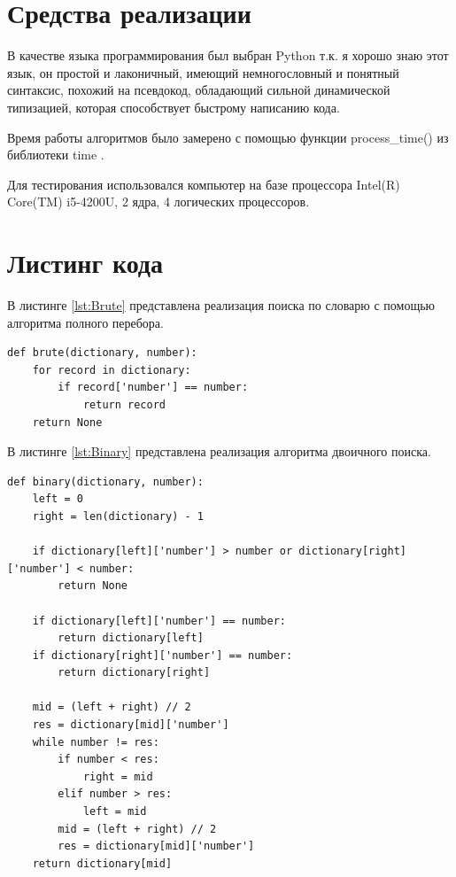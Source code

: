 \documentclass[12pt]{report}
\begin{document}
\section{Средства реализации}
В качестве языка программирования был выбран Python т.к. я хорошо знаю этот язык, он простой и лаконичный, имеющий немногословный и понятный синтаксис, похожий на псевдокод, обладающий сильной динамической типизацией, которая способствует быстрому написанию кода. 
 
Время  работы алгоритмов было замерено с помощью функции process\_time() из библиотеки time \cite{time}.

Для тестирования использовался компьютер на базе процессора Intel(R) Core(TM) i5-4200U, 2 ядра, 4 логических процессоров. 


\newpage
\section{Листинг кода}

В листинге \ref{lst:Brute} представлена реализация поиска по словарю с помощью алгоритма полного перебора.

\begin{lstlisting}[label={lst:Brute},caption=Реализация поиска по словарю с помощью алгоритма полного перебора.]
def brute(dictionary, number):
    for record in dictionary:
        if record['number'] == number:
            return record
    return None
\end{lstlisting} 

\vspace{\baselineskip}
В листинге \ref{lst:Binary} представлена реализация алгоритма двоичного поиска.
\begin{lstlisting}[label={lst:Binary},caption=Реализация алгоритма двоичного поиска.]
def binary(dictionary, number):
    left = 0
    right = len(dictionary) - 1

    if dictionary[left]['number'] > number or dictionary[right]['number'] < number:
        return None

    if dictionary[left]['number'] == number:
        return dictionary[left]
    if dictionary[right]['number'] == number:
        return dictionary[right]

    mid = (left + right) // 2
    res = dictionary[mid]['number']
    while number != res:
        if number < res:
            right = mid
        elif number > res:
            left = mid
        mid = (left + right) // 2
        res = dictionary[mid]['number']
    return dictionary[mid]
\end{lstlisting}
\end{document}

